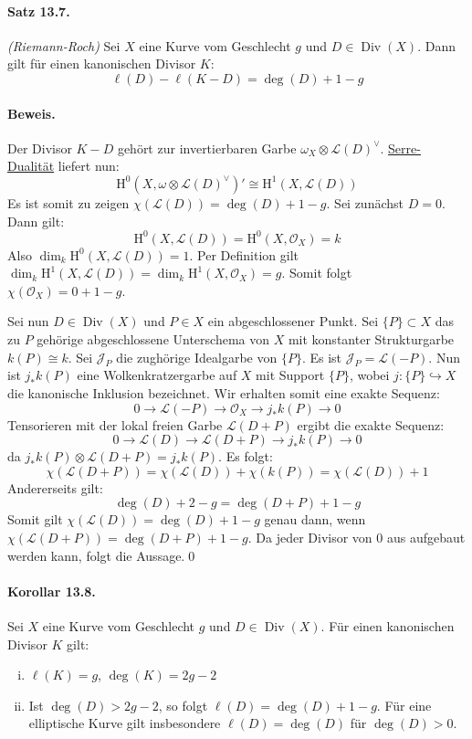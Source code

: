 \paragraph{Satz 13.7.}\label{13.7} \textit{(Riemann-Roch)} Sei $X$ eine Kurve vom Geschlecht $g$ und $D\in\operatorname{Div}(X)$. Dann gilt für einen kanonischen Divisor $K$:
\[\ell(D)-\ell(K-D) = \deg(D)+1-g \]

\paragraph{Beweis.} Der Divisor $K-D$ gehört zur invertierbaren Garbe $\omega_X\otimes\mathcal{L}(D)^\vee$. \hyperref[12.10]{Serre-Dualität} liefert nun:
\[\mathrm{H}^0(X,\omega\otimes\mathcal{L}(D)^\vee)' \cong\mathrm{H}^1(X,\mathcal{L}(D)) \]
Es ist somit zu zeigen $\chi(\mathcal{L}(D))=\deg(D)+1-g$. Sei zunächst $D=0$. Dann gilt:
\[\mathrm{H}^0(X,\mathcal{L}(D))=\mathrm{H}^0(X,\mathcal{O}_X)=k \]
Also $\dim_k\mathrm{H}^0(X,\mathcal{L}(D))=1$. Per Definition gilt $\dim_k\mathrm{H}^1(X,\mathcal{L}(D))=\dim_k\mathrm{H}^1(X,\mathcal{O}_X)=g$. Somit folgt $\chi(\mathcal{O}_X)=0+1-g$.

Sei nun $D\in\operatorname{Div}(X)$ und $P\in X$ ein abgeschlossener Punkt. Sei $\{P\}\subset X$ das zu $P$ gehörige abgeschlossene Unterschema von $X$ mit konstanter Strukturgarbe $k(P)\cong k$. Sei $\mathcal{J}_P$ die zughörige Idealgarbe von $\{P\}$. Es ist $\mathcal{J}_P=\mathcal{L}(-P)$. Nun ist $j_\ast k(P)$ eine Wolkenkratzergarbe auf $X$ mit Support $\{P\}$, wobei $j:\{P\}\hookrightarrow X$ die kanonische Inklusion bezeichnet. Wir erhalten somit eine exakte Sequenz:
\[0\longrightarrow\mathcal{L}(-P)\longrightarrow\mathcal{O}_X\longrightarrow j_\ast k(P)\longrightarrow 0 \]
Tensorieren mit der lokal freien Garbe $\mathcal{L}(D+P)$ ergibt die exakte Sequenz:
\[0\longrightarrow\mathcal{L}(D)\longrightarrow\mathcal{L}(D+P)\longrightarrow j_\ast k(P)\longrightarrow 0 \]
da $j_\ast k(P)\otimes\mathcal{L}(D+P)=j_\ast k(P)$. Es folgt:
\[\chi(\mathcal{L}(D+P)) = \chi(\mathcal{L}(D)) + \chi(k(P))=\chi(\mathcal{L}(D))+1 \]
Andererseits gilt:
\[\deg(D) + 2 - g = \deg(D+P) + 1 - g \]
Somit gilt $\chi(\mathcal{L}(D))=\deg(D)+1-g$ genau dann, wenn $\chi(\mathcal{L}(D+P)) = \deg(D+P)+1-g$. Da jeder Divisor von $0$ aus aufgebaut werden kann, folgt die Aussage.\qed

\paragraph{Korollar 13.8.}\label{13.8} Sei $X$ eine Kurve vom Geschlecht $g$ und $D\in\operatorname{Div}(X)$. Für einen kanonischen Divisor $K$ gilt:
\begin{enumerate}[(i)]
\item $\ell(K)=g$, $\deg(K)=2g-2$
\item Ist $\deg(D)>2g-2$, so folgt $\ell(D)=\deg(D)+1-g$. Für eine elliptische Kurve gilt insbesondere $\ell(D)=\deg(D)$ für $\deg(D)>0$.
\end{enumerate}

